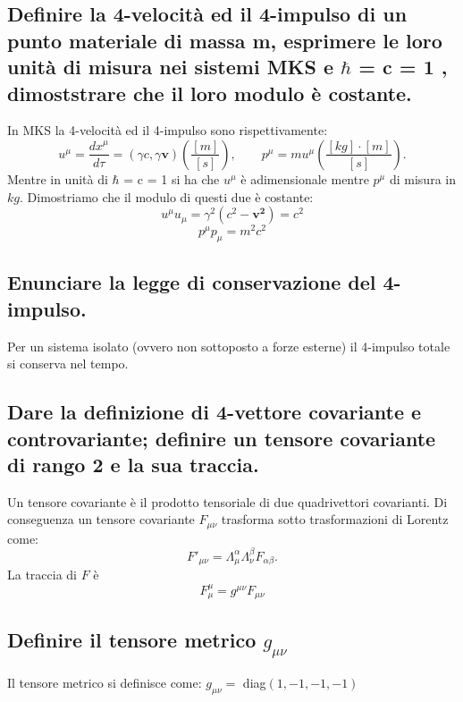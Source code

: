 \subsection[ 4-velocità e 4-impulso]{Definire la 4-velocità ed il 4-impulso di un punto materiale di massa m, esprimere le loro unità di misura nei sistemi MKS e $\hbar$ = c = 1 , dimoststrare che il loro modulo è costante.} 
In MKS la 4-velocità ed il 4-impulso sono rispettivamente:
\[
	u^{\mu} = \frac{dx^{\mu}}{d\tau} = \left( \gamma c, \gamma \boldsymbol{v}  \right) \left( \frac{[m]}{[s]}\right) , \quad \quad 
	p^{\mu} = mu^{\mu} \left( \frac{[kg] \cdot [m]}{[s]} \right) 
.\]
Mentre in unità di $\hbar$ = c = 1 si ha che $u^{\mu}$ è adimensionale mentre $p^{\mu}$ di misura in $kg$.
Dimostriamo che il modulo di questi due è costante:
\[
	u^{\mu}u_{\mu} = \gamma^{2}\left( c^{2} - \boldsymbol{v^{2}} \right) = c^{2} 
\]
 \[
	p^{\mu}p_{\mu} = m^2c^2
\] 
\subsection[ Conservazione del quadrimpulso]{Enunciare la legge di conservazione del 4-impulso.}
Per un sistema isolato (ovvero non sottoposto a forze esterne) il 4-impulso totale si conserva nel tempo.
\subsection[$ \ $ Vettore covariante e tensore covariante]{Dare la definizione di 4-vettore covariante e controvariante; definire un tensore covariante di rango 2 e la sua traccia.}
\label{sec:1.a.10}
Un tensore covariante è il prodotto tensoriale di due quadrivettori covarianti. Di conseguenza un tensore covariante $F_{\mu \nu}$ trasforma sotto trasformazioni di Lorentz come:
\[
	F'_{\mu \nu} = \Lambda_{\mu}^{\alpha}\Lambda_{\nu}^{\beta} F_{\alpha \beta}  
.\]
La traccia di $F$ è 
\[
	F^{\mu}_{\mu} = g^{\mu \nu} F_{\mu \nu}
\] 
\subsection[ $ \ $Tensore metrico]{Definire il tensore metrico $g_{\mu \nu}$}
Il tensore metrico si definisce come: $g_{\mu \nu} = $ diag$\left( 1,-1,-1,-1 \right) $ 

